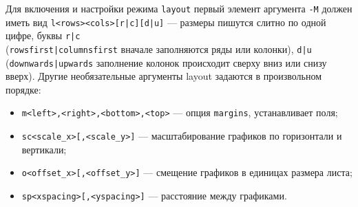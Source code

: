 \documentclass[12pt]{article}
\begin{document}
Для включения и настройки режима \verb'layout' первый элемент аргумента \verb'-M' должен иметь вид
\verb'l<rows><cols>[r|с][d|u]' ---  размеры пишутся слитно по одной 
цифре, буквы \verb'r|с'\\ (\verb'rowsfirst|columnsfirst' вначале заполняются ряды или колонки),
\verb'd|u' (\verb'downwards|upwards' заполнение колонок происходит сверху вниз или снизу вверх).
Другие необязательные аргументы layout задаются в произвольном порядке:
\begin{itemize}
\item  \verb'm<left>,<right>,<bottom>,<top>' --- опция \verb'margins', устанавливает поля;
\item  \verb'sс<scale_x>[,<scale_y>]' --- масштабирование графиков по горизонтали и вертикали;
\item  \verb'o<offset_x>[,<offset_y>]' --- смещение графиков в единицах размера листа;
\item  \verb'sp<xspacing>[,<yspacing>]' --- расстояние между графиками.
\end{itemize}
\end{document}
